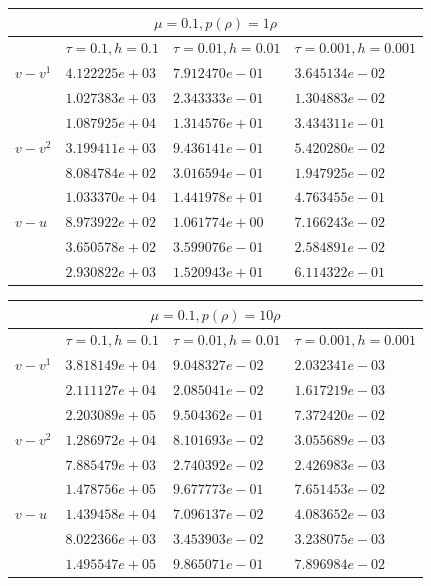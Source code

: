 \documentclass[12pt,a4paper]{article}
\begin{document}
\begin{tabular}{ |l|l|l|l|}
    \hline
    \multicolumn{4}{|c|}{$\mu = 0.1, p(\rho) = 1\rho$} \\
    \hline
    &$\tau = 0.1, h = 0.1$ &$\tau = 0.01, h = 0.01$ &$\tau = 0.001, h = 0.001$ \\
    \hline
    $v-v^{1}$& $4.122225e+03$ & $7.912470e-01$ & $3.645134e-02$ \\
    & $1.027383e+03$ & $2.343333e-01$ & $1.304883e-02$ \\
    & $1.087925e+04$ & $1.314576e+01$ & $3.434311e-01$ \\
    \hline
    $v-v^{2}$& $3.199411e+03$ & $9.436141e-01$ & $5.420280e-02$ \\
    & $8.084784e+02$ & $3.016594e-01$ & $1.947925e-02$ \\
    & $1.033370e+04$ & $1.441978e+01$ & $4.763455e-01$ \\
    \hline
    $v-u$& $8.973922e+02$ & $1.061774e+00$ & $7.166243e-02$ \\
    & $3.650578e+02$ & $3.599076e-01$ & $2.584891e-02$ \\
    & $2.930822e+03$ & $1.520943e+01$ & $6.114322e-01$ \\
    \hline
\end{tabular}

\begin{tabular}{ |l|l|l|l|}
    \hline
    \multicolumn{4}{|c|}{$\mu = 0.1, p(\rho) = 10\rho$} \\
    \hline
    &$\tau = 0.1, h = 0.1$ &$\tau = 0.01, h = 0.01$ &$\tau = 0.001, h = 0.001$ \\
    \hline
    $v-v^{1}$& $3.818149e+04$ & $9.048327e-02$ & $2.032341e-03$ \\
    & $2.111127e+04$ & $2.085041e-02$ & $1.617219e-03$ \\
    & $2.203089e+05$ & $9.504362e-01$ & $7.372420e-02$ \\
    \hline
    $v-v^{2}$& $1.286972e+04$ & $8.101693e-02$ & $3.055689e-03$ \\
    & $7.885479e+03$ & $2.740392e-02$ & $2.426983e-03$ \\
    & $1.478756e+05$ & $9.677773e-01$ & $7.651453e-02$ \\
    \hline
    $v-u$& $1.439458e+04$ & $7.096137e-02$ & $4.083652e-03$ \\
    & $8.022366e+03$ & $3.453903e-02$ & $3.238075e-03$ \\
    & $1.495547e+05$ & $9.865071e-01$ & $7.896984e-02$ \\
    \hline
\end{tabular}
\end{document}

